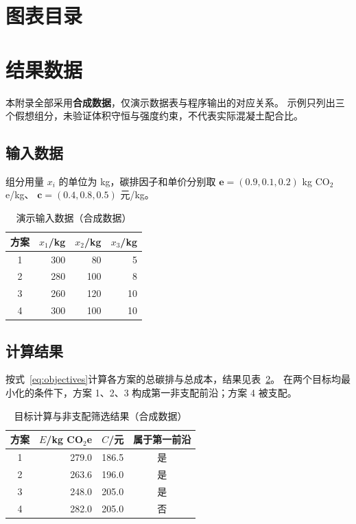 \section{图表目录}
\label{app:catalog}
\begingroup
  \renewcommand{\listfigurename}{插图}
  \renewcommand{\listtablename}{表格}
  \renewcommand{\listalgorithmname}{算法}
  \listoffigures
  \listoftables
  \listofalgorithms
\endgroup

\clearpage
\section{结果数据}
\label{app:data}
本附录全部采用\textbf{合成数据}，仅演示数据表与程序输出的对应关系。
示例只列出三个假想组分，未验证体积守恒与强度约束，不代表实际混凝土配合比。

\subsection{输入数据}
组分用量 $x_i$ 的单位为 kg，碳排因子和单价分别取
$\boldsymbol{e}=(0.9,0.1,0.2)$ kg CO$_2$e/kg、
$\boldsymbol{c}=(0.4,0.8,0.5)$ 元/kg。
\begin{table}[htbp]
  \centering
  \caption{演示输入数据（合成数据）}
  \label{tab:appendix-input}
  \begin{tabular}{@{}crrr@{}}
    \toprule
    方案 & $x_1$/kg & $x_2$/kg & $x_3$/kg\\
    \midrule
    1 & 300 & 80 & 5\\
    2 & 280 & 100 & 8\\
    3 & 260 & 120 & 10\\
    4 & 300 & 100 & 10\\
    \bottomrule
  \end{tabular}
\end{table}

\subsection{计算结果}
按式~\eqref{eq:objectives}计算各方案的总碳排与总成本，结果见表~\ref{tab:appendix-output}。
在两个目标均最小化的条件下，方案 1、2、3 构成第一非支配前沿；方案 4 被支配。
\begin{table}[htbp]
  \centering
  \caption{目标计算与非支配筛选结果（合成数据）}
  \label{tab:appendix-output}
  \begin{tabular}{@{}crrc@{}}
    \toprule
    方案 & $E$/kg CO$_2$e & $C$/元 & 属于第一前沿\\
    \midrule
    1 & 279.0 & 186.5 & 是\\
    2 & 263.6 & 196.0 & 是\\
    3 & 248.0 & 205.0 & 是\\
    4 & 282.0 & 205.0 & 否\\
    \bottomrule
  \end{tabular}
\end{table}

